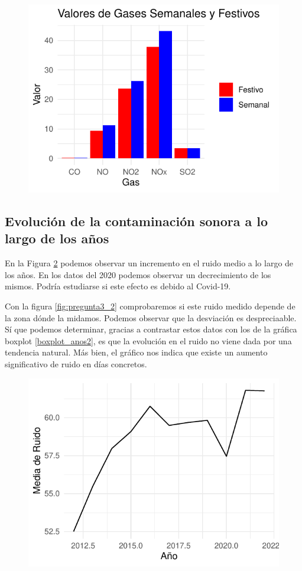 \documentclass[notspecified,article,submit,moreauthors,pdftex]{Definitions/mdpi}
\begin{document}
\begin{figure}

\includegraphics[width=0.7\linewidth]{ProyectoAED2023_files/figure-latex/pregunta2-1} \hfill{}

\caption{\label{fig:pregunta2}}\label{fig:pregunta2}
\end{figure}

\hypertarget{evoluciuxf3n-de-la-contaminaciuxf3n-sonora-a-lo-largo-de-los-auxf1os}{%
\subsection{Evolución de la contaminación sonora a lo largo de los
años}\label{evoluciuxf3n-de-la-contaminaciuxf3n-sonora-a-lo-largo-de-los-auxf1os}}

En la Figura \ref{fig:pregunta3_1} podemos observar un incremento en el
ruido medio a lo largo de los años. En los datos del 2020 podemos
observar un decrecimiento de los mismos. Podría estudiarse si este
efecto es debido al Covid-19.

Con la figura \ref{fig:pregunta3_2} comprobaremos si este ruido medido
depende de la zona dónde la midamos. Podemos observar que la desviación
es despreciaable. Sí que podemos determinar, gracias a contrastar estos
datos con los de la gráfica boxplot \ref{boxplot_anos2}, es que la
evolución en el ruido no viene dada por una tendencia natural. Más bien,
el gráfico nos indica que existe un aumento significativo de ruido en
días concretos.

\begin{figure}

\includegraphics[width=0.7\linewidth]{ProyectoAED2023_files/figure-latex/pregunta3_1-1} \hfill{}

\caption{\label{fig:pregunta3_1}}\label{fig:pregunta3_1}
\end{figure}
\end{document}
